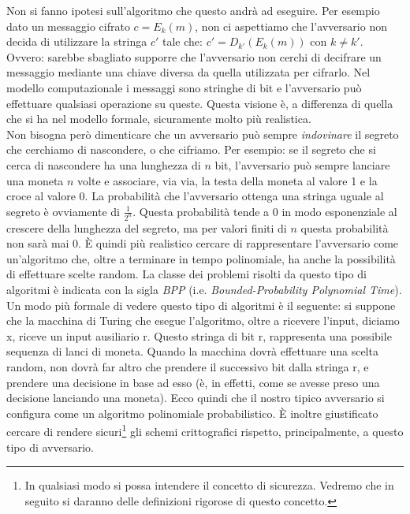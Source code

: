 \documentclass[a4paper,openright,twoside,12pt]{report}
\begin{document}
Non si fanno ipotesi sull'algoritmo che questo andr\`a ad eseguire.
Per esempio dato un messaggio cifrato $c=E_k(m)$, non ci aspettiamo che l'avversario non decida di utilizzare la stringa $c'$ tale che:  $c'=D_{k'}(E_k(m))$ con $k\neq k'$. 
Ovvero: sarebbe sbagliato supporre che l'avversario non cerchi di decifrare un messaggio mediante una chiave diversa 
da quella utilizzata per cifrarlo.
Nel modello computazionale i messaggi sono stringhe di bit e l'avversario pu\`o effettuare qualsiasi operazione su queste. Questa visione \`e, a differenza di quella 
che si ha nel modello formale, sicuramente molto pi\`u realistica\cite{DBLP:conf/crypto/2006}.\\

Non bisogna per\`o dimenticare che un avversario può sempre \emph{indovinare} il segreto che cerchiamo di nascondere, o che cifriamo. 
Per esempio: se il segreto che si cerca di nascondere ha una lunghezza di $n$ bit, l'avversario può sempre
lanciare una moneta $n$ volte e associare, via via, la testa della moneta al valore 1 e la croce al valore 0.
La probabilit\`a che l'avversario ottenga una stringa uguale al segreto \`e ovviamente di $\frac{1}{2^n}$. 
Questa probabilit\`a tende a 0 in modo esponenziale al crescere della lunghezza del segreto, ma per valori finiti di $n$ questa probabilit\`a non sar\`a mai 0.
\`E quindi pi\`u realistico cercare di rappresentare l'avversario come un'algoritmo che, oltre a terminare in tempo polinomiale, ha
anche la possibilit\`a di effettuare scelte random.
La classe dei problemi risolti da questo tipo di algoritmi \`e indicata con la
sigla \emph{BPP} (i.e. \emph{Bounded-Probability Polynomial Time}).\\Un modo pi\`u formale di vedere questo tipo di algoritmi \`e il seguente: si suppone che la macchina di Turing che 
esegue l'algoritmo, oltre a ricevere l'input, diciamo x, riceve un input ausiliario r. Questo stringa di bit r, rappresenta una possibile sequenza di lanci di moneta.
Quando la macchina dovr\`a effettuare una scelta random, non dovr\`a far altro che prendere il successivo bit dalla stringa r, e prendere una decisione in base ad esso
(\`e, in effetti, come se avesse preso una decisione lanciando una moneta). Ecco quindi che il nostro tipico avversario si configura come un algoritmo polinomiale probabilistico.
\`E inoltre giustificato cercare di rendere sicuri\footnote{In qualsiasi modo si possa intendere il concetto di sicurezza. 
Vedremo che in seguito si daranno delle definizioni rigorose di questo concetto.} gli schemi crittografici rispetto, principalmente, a questo tipo di avversario.
\end{document}

